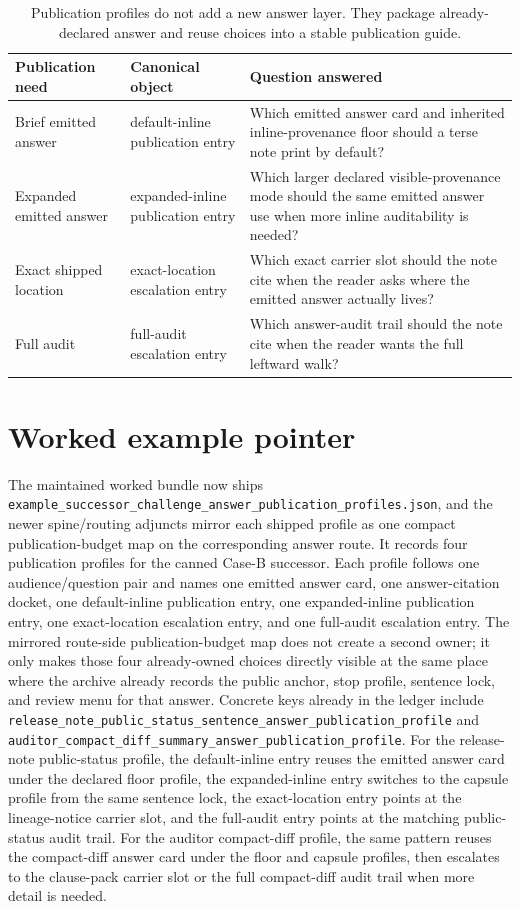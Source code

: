 \documentclass[11pt]{article}
\begin{document}
\begin{table}[t]
\centering
\small
\begin{tabularx}{\linewidth}{@{}l l X@{}}
\toprule
Publication need & Canonical object & Question answered \\
\midrule
Brief emitted answer & default-inline publication entry & Which emitted answer card and inherited inline-provenance floor should a terse note print by default? \\
Expanded emitted answer & expanded-inline publication entry & Which larger declared visible-provenance mode should the same emitted answer use when more inline auditability is needed? \\
Exact shipped location & exact-location escalation entry & Which exact carrier slot should the note cite when the reader asks where the emitted answer actually lives? \\
Full audit & full-audit escalation entry & Which answer-audit trail should the note cite when the reader wants the full leftward walk? \\
\bottomrule
\end{tabularx}
\caption{Publication profiles do not add a new answer layer. They package already-declared answer and reuse choices into a stable publication guide.}
\label{tab:answerpublicationprofiles}
\end{table}

\section{Worked example pointer}
The maintained worked bundle now ships \texttt{example\_successor\_challenge\_answer\_publication\_profiles.json}, and the newer spine/routing adjuncts mirror each shipped profile as one compact publication-budget map on the corresponding answer route.\cite{series:workedexample}
It records four publication profiles for the canned Case-B successor.
Each profile follows one audience/question pair and names one emitted answer card, one answer-citation docket, one default-inline publication entry, one expanded-inline publication entry, one exact-location escalation entry, and one full-audit escalation entry. The mirrored route-side publication-budget map does not create a second owner; it only makes those four already-owned choices directly visible at the same place where the archive already records the public anchor, stop profile, sentence lock, and review menu for that answer.
Concrete keys already in the ledger include \texttt{release\_note\_public\_status\_sentence\_answer\_publication\_profile} and \texttt{auditor\_compact\_diff\_summary\_answer\_publication\_profile}.
For the release-note public-status profile, the default-inline entry reuses the emitted answer card under the declared floor profile, the expanded-inline entry switches to the capsule profile from the same sentence lock, the exact-location entry points at the lineage-notice carrier slot, and the full-audit entry points at the matching public-status audit trail.
For the auditor compact-diff profile, the same pattern reuses the compact-diff answer card under the floor and capsule profiles, then escalates to the clause-pack carrier slot or the full compact-diff audit trail when more detail is needed.
\end{document}
